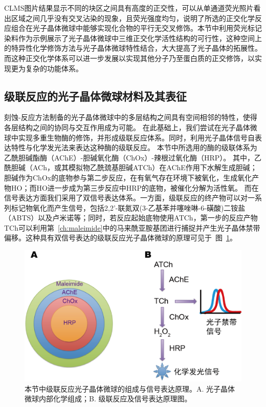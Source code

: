 CLMS图片结果显示不同的块区之间具有高度的正交性，可以从单通道荧光照片看出区域之间几乎没有交叉沾染的现象，且荧光强度均匀，说明了所选的正交化学反应组合在光子晶体微球中能够实现化合物的平行无交叉修饰。本节中利用荧光标记染料作为示例展示了光子晶体微球中三维正交化学活性结构的可行性，这种空间上的特异性化学修饰方法与光子晶体微球特性结合，大大提高了光子晶体的拓展性。而这种正交化学体系可以进一步发展以实现其他分子乃至蛋白质的正交修饰\cite{Rahmani2014Chemically}，以实现更为复杂的功能体系。

\subsection{级联反应的光子晶体微球材料及其表征}
刻蚀-反应方法制备的光子晶体微球中的多层结构之间具有空间相邻的特性，使得各层结构之间的协同与交互作用成为可能。
在此基础上，我们尝试在光子晶体微球中实现多重生物酶的修饰，并形成级联反应体系。同时，利用光子晶体信号自表达特性与化学发光法来表达这种酶的级联反应。
本节中所选用的酶的级联体系为乙酰胆碱酯酶（AChE）-胆碱氧化酶（ChOx）-辣根过氧化酶（HRP）。
其中，乙酰胆碱（ACh，或其模拟物乙酰巯基胆碱ATCh）在AChE作用下水解生成胆碱；胆碱作为ChOx的底物参与第二步反应，在有氧气存在环境下被氧化，生成氧化产物HO；而HO进一步成为第三步反应中HRP的底物，被催化分解为活性氧。
而在信号表达方面我们采用了双信号表达体系。一方面，级联反应的终产物可以对一系列标记物氧化而产生信号，包括2,2'-联氮双(3-乙基苯并噻唑啉-6-磺酸)二铵盐（ABTS）以及卢米诺等；同时，若反应起始底物使用ATCh，第一步的反应产物TCh可以利用第~\ref{ch:maleimide}中的马来酰亚胺基团进行捕捉并产生光子晶体禁带偏移。这种具有双信号表达的级联反应光子晶体微球的原理可见于\
图~\ref{fig:cascade-principle}。
\begin{figure}[htbp]
  \centering
  \includegraphics[width=0.7\linewidth]{figures/ch5/cascade-principle.png}
  \caption{本节中级联反应光子晶体微球的组成与信号表达原理。A. 光子晶体微球内部化学组成；B. 级联反应及信号表达原理图。}
  \label{fig:cascade-principle}
\end{figure}

